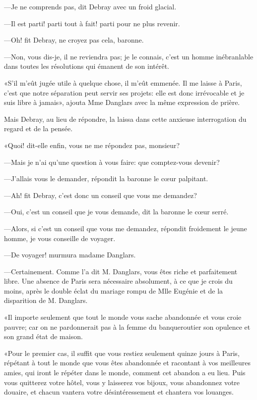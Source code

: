 —Je ne comprends pas, dit Debray avec un froid glacial. 

—Il est parti! parti tout à fait! parti pour ne plus revenir. 

—Oh! fit Debray, ne croyez pas cela, baronne. 

—Non, vous dis-je, il ne reviendra pas; je le connais, c'est un homme inébranlable dans toutes les résolutions qui émanent de son intérêt. 

«S'il m'eût jugée utile à quelque chose, il m'eût emmenée. Il me laisse à Paris, c'est que notre séparation peut servir ses projets: elle est donc irrévocable et je suis libre à jamais», ajouta Mme Danglars avec la même expression de prière. 

Mais Debray, au lieu de répondre, la laissa dans cette anxieuse interrogation du regard et de la pensée. 

«Quoi! dit-elle enfin, vous ne me répondez pas, monsieur? 

—Mais je n'ai qu'une question à vous faire: que comptez-vous devenir? 

—J'allais vous le demander, répondit la baronne le cœur palpitant. 

—Ah! fit Debray, c'est donc un conseil que vous me demandez? 

—Oui, c'est un conseil que je vous demande, dit la baronne le cœur serré. 

—Alors, si c'est un conseil que vous me demandez, répondit froidement le jeune homme, je vous conseille de voyager. 

—De voyager! murmura madame Danglars. 

—Certainement. Comme l'a dit M. Danglars, vous êtes riche et parfaitement libre. Une absence de Paris sera nécessaire absolument, à ce que je crois du moins, après le double éclat du mariage rompu de Mlle Eugénie et de la disparition de M. Danglars. 

«Il importe seulement que tout le monde vous sache abandonnée et vous croie pauvre; car on ne pardonnerait pas à la femme du banqueroutier son opulence et son grand état de maison. 

«Pour le premier cas, il suffit que vous restiez seulement quinze jours à Paris, répétant à tout le monde que vous êtes abandonnée et racontant à vos meilleures amies, qui iront le répéter dans le monde, comment cet abandon a eu lieu. Puis vous quitterez votre hôtel, vous y laisserez vos bijoux, vous abandonnez votre douaire, et chacun vantera votre désintéressement et chantera vos louanges. 

